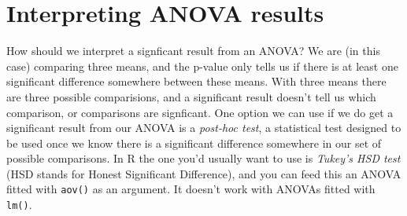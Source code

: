 \documentclass[
]{book}
\newenvironment{Shaded}{\begin{snugshade}}{\end{snugshade}}
\newcommand{\DataTypeTok}[1]{\textcolor[rgb]{0.13,0.29,0.53}{#1}}
\newcommand{\DecValTok}[1]{\textcolor[rgb]{0.00,0.00,0.81}{#1}}
\newcommand{\FloatTok}[1]{\textcolor[rgb]{0.00,0.00,0.81}{#1}}
\newcommand{\KeywordTok}[1]{\textcolor[rgb]{0.13,0.29,0.53}{\textbf{#1}}}
\newcommand{\NormalTok}[1]{#1}
\newcommand{\OperatorTok}[1]{\textcolor[rgb]{0.81,0.36,0.00}{\textbf{#1}}}
\newcommand{\StringTok}[1]{\textcolor[rgb]{0.31,0.60,0.02}{#1}}
\begin{document}
\hypertarget{interpreting-anova-results}{%
\section{Interpreting ANOVA results}\label{interpreting-anova-results}}

How should we interpret a signficant result from an ANOVA? We are (in this case) comparing three means, and the p-value only tells us if there is at least one significant difference somewhere between these means. With three means there are three possible comparisions, and a significant result doesn't tell us which comparison, or comparisons are signficant. One option we can use if we do get a significant result from our ANOVA is a \emph{post-hoc test}, a statistical test designed to be used once we know there is a significant difference somewhere in our set of possible comparisons. In R the one you'd usually want to use is \emph{Tukey's HSD test} (HSD stands for Honest Significant Difference), and you can feed this an ANOVA fitted with \texttt{aov()} as an argument. It doesn't work with ANOVAs fitted with \texttt{lm()}.

\begin{Shaded}
\end{Shaded}
\end{document}
